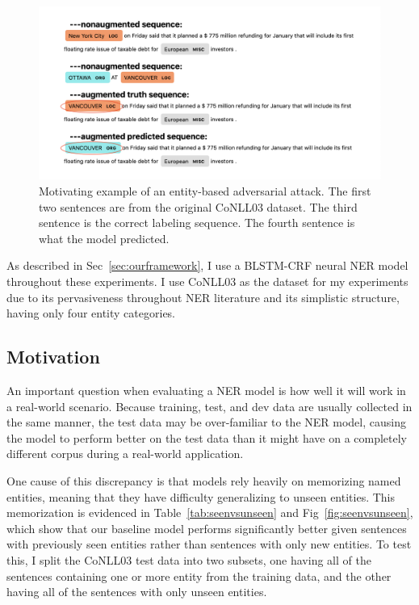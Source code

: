 \begin{figure}[h]
	\centering
	\includegraphics[width=1\linewidth]{LatexDiss/figures/LOCmotivatingexample.png}
	\caption{Motivating example of an entity-based adversarial attack. The first two sentences are from the original CoNLL03 dataset. The third sentence is the correct labeling sequence. The fourth sentence is what the model predicted.}
	\label{fig:motivatingexampleswitch}
\end{figure}


As described in Sec~\ref{sec:ourframework}, I use a BLSTM-CRF neural NER model throughout these experiments. I use CoNLL03 as the dataset for my experiments due to its pervasiveness throughout NER literature and its simplistic structure, having only four entity categories.

\subsection{Motivation}
An important question when evaluating a NER model is how well it will work in a real-world scenario. Because training, test, and dev data are usually collected in the same manner, the test data may be over-familiar to the NER model, causing the model to perform better on the test data than it might have on a completely different corpus during a real-world application. 

One cause of this discrepancy is that models rely heavily on memorizing named entities, meaning that they have difficulty generalizing to unseen entities. This memorization is evidenced in Table~\ref{tab:seenvsunseen} and Fig~\ref{fig:seenvsunseen}, which show that our baseline model performs significantly better given sentences with previously seen entities rather than sentences with only new entities. To test this, I split the CoNLL03 test data into two subsets, one having all of the sentences containing one or more entity from the training data, and the other having all of the sentences with only unseen entities.

